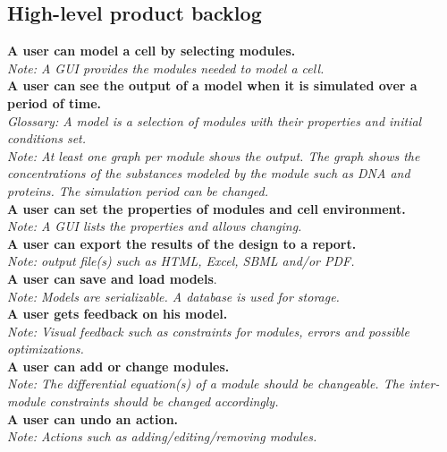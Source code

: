 \documentclass[10pt,a4paper]{report}
\begin{document}
		\subsection{High-level product backlog}
			\textbf{A user can model a cell by selecting modules.}\\
			\indent
				\textit{Note: A GUI provides the modules needed to model a cell.}\\
			\textbf{A user can see the output of a model when it is simulated over a period of time.}\\
			\indent
				\textit{Glossary: A model is a selection of modules with their properties and initial conditions set.}\\
			\indent
				\textit{Note: At least one graph per module shows the output. The graph shows the concentrations of the substances modeled by the module such as DNA and proteins. The simulation period can be changed.}\\
			\textbf{A user can set the properties of modules and cell environment.}\\
			\indent
				\textit{Note: A GUI lists the properties and allows changing.}\\
			\textbf{A user can export the results of the design to a report.}\\
			\indent
				\textit{Note: output file(s) such as HTML, Excel, SBML and/or PDF.}\\
			\textbf{A user can save and load models}.\\
			\indent
				\textit{Note: Models are serializable. A database is used for storage.}\\
			\textbf{A user gets feedback on his model.}\\
			\indent
				\textit{Note: Visual feedback such as constraints for modules, errors and possible optimizations.}\\
			\textbf{A user can add or change modules.}\\
			\indent
				\textit{Note: The differential equation(s) of a module should be changeable. The inter-module constraints should be changed accordingly.}\\
			\textbf{A user can undo an action.}\\
			\indent
				\textit{Note: Actions such as adding/editing/removing modules.}\\
			
		\clearpage
\end{document}
